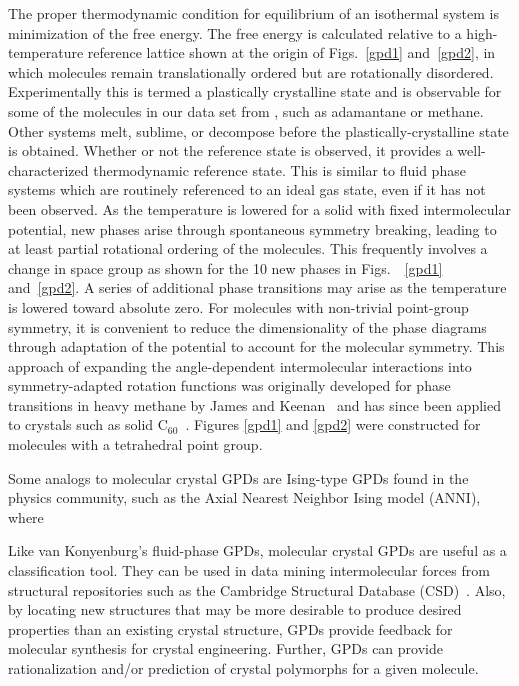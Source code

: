 \documentclass[preprint]{iucr}              %
\begin{document}
The proper thermodynamic condition for equilibrium of an isothermal system is
minimization of the free energy.  The free energy is calculated relative to a
high-temperature
reference lattice shown at the origin of Figs.~\ref{gpd1}
and~\ref{gpd2}, in which
molecules remain translationally ordered but are rotationally disordered. 
Experimentally this is
termed a plastically crystalline state \cite{Sherwood79} and is observable for
some of the molecules in our data set from \cite{McClurg09}, such as
adamantane or methane.  Other systems melt, sublime, or decompose before the
plastically-crystalline state is obtained.  Whether or not the reference state
is observed, it provides a well-characterized thermodynamic reference state. 
This is similar to fluid phase systems which are routinely referenced to an
ideal gas state, even if it has not been observed.  As the temperature is
lowered for a solid with fixed intermolecular potential, new phases arise
through spontaneous symmetry breaking, leading to at least partial rotational
ordering of the molecules.  This frequently involves a change in space group as
shown for the 10 new phases in Figs.~~\ref{gpd1}
and~\ref{gpd2}.  A series of additional phase transitions may arise as the
temperature is lowered toward absolute zero. For molecules with non-trivial
point-group symmetry, it is convenient to reduce the dimensionality of the phase
diagrams through adaptation of the potential to account for the molecular
symmetry. This approach of expanding the angle-dependent intermolecular
interactions into symmetry-adapted rotation functions was originally developed
for phase transitions in heavy methane by James and Keenan~\cite{James59} and
has since been applied to crystals such as solid
C$_{60}$~\cite{Michel92,Lamoen99}.  Figures \ref{gpd1} and \ref{gpd2} were
constructed for molecules with a tetrahedral point group.

Some analogs to molecular crystal GPDs are Ising-type GPDs found in the
physics community, such as the Axial Nearest Neighbor Ising model (ANNI), where 


Like van Konyenburg's fluid-phase GPDs, molecular crystal
GPDs are useful as a classification tool.  They can be used in data mining intermolecular forces from
structural repositories such as the Cambridge Structural Database
(CSD)~\cite{Allen02}.  Also, by locating new structures that may be more
desirable to produce desired properties than an existing crystal structure, GPDs
provide feedback for molecular synthesis for crystal engineering. Further, GPDs
can provide rationalization and/or prediction of crystal polymorphs for a given
molecule.
\end{document}
